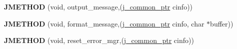 \begin{DoxyCompactItemize}
\mbox{\label{structjpeg__error__mgr_ac2989f8ef34acdd78ce26a9110a1c094}} 
{\bfseries J\+M\+E\+T\+H\+OD} (void, output\+\_\+message,(\hyperlink{structjpeg__common__struct}{j\+\_\+common\+\_\+ptr} cinfo))
\item 
\mbox{\label{structjpeg__error__mgr_a5f1dfb51c337c36ae1bc5fae7f84528f}} 
{\bfseries J\+M\+E\+T\+H\+OD} (void, format\+\_\+message,(\hyperlink{structjpeg__common__struct}{j\+\_\+common\+\_\+ptr} cinfo, char $\ast$buffer))
\item 
\mbox{\label{structjpeg__error__mgr_ac676478083167b3731995d7901bd4b6c}} 
{\bfseries J\+M\+E\+T\+H\+OD} (void, reset\+\_\+error\+\_\+mgr,(\hyperlink{structjpeg__common__struct}{j\+\_\+common\+\_\+ptr} cinfo))
\end{DoxyCompactItemize}
